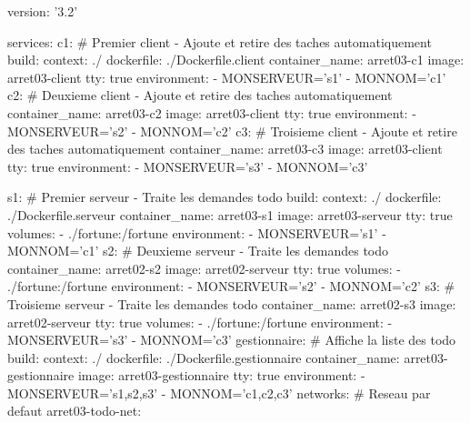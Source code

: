 \begin{code}[listing options={language=YAML},
  title=\texttt{arret03/docker-compose.yml}
]
version: '3.2'

services:
    c1: # Premier client - Ajoute et retire des taches automatiquement
      build:
        context: ./
        dockerfile: ./Dockerfile.client
      container_name: arret03-c1
      image: arret03-client
      tty: true
      environment:
        - MONSERVEUR='s1'
        - MONNOM='c1'
    c2: # Deuxieme client - Ajoute et retire des taches automatiquement
      container_name: arret03-c2
      image: arret03-client
      tty: true
      environment:
        - MONSERVEUR='s2'
        - MONNOM='c2'
    c3: # Troisieme client - Ajoute et retire des taches automatiquement
      container_name: arret03-c3
      image: arret03-client
      tty: true
      environment:
        - MONSERVEUR='s3'
        - MONNOM='c3'
\end{code}
\begin{code}[listing options={language=YAML},
  title=\verb!docker-compose.yml! (suite)
]
    s1: # Premier serveur - Traite les demandes todo
      build:
        context: ./
        dockerfile: ./Dockerfile.serveur
      container_name: arret03-s1
      image: arret03-serveur
      tty: true
      volumes:
        - ./fortune:/fortune
      environment:
        - MONSERVEUR='s1'
        - MONNOM='c1'
    s2: # Deuxieme serveur - Traite les demandes todo
      container_name: arret02-s2
      image: arret02-serveur
      tty: true
      volumes:
        - ./fortune:/fortune
      environment:
        - MONSERVEUR='s2'
        - MONNOM='c2'
    s3: # Troisieme serveur - Traite les demandes todo
      container_name: arret02-s3
      image: arret02-serveur
      tty: true
      volumes:
        - ./fortune:/fortune
      environment:
        - MONSERVEUR='s3'
        - MONNOM='c3'
    gestionnaire: # Affiche la liste des todo
      build:
        context: ./
        dockerfile: ./Dockerfile.gestionnaire
      container_name: arret03-gestionnaire
      image: arret03-gestionnaire
      tty: true
      environment:
        - MONSERVEUR='s1,s2,s3'
        - MONNOM='c1,c2,c3'
networks: # Reseau par defaut
  arret03-todo-net:
\end{code}
